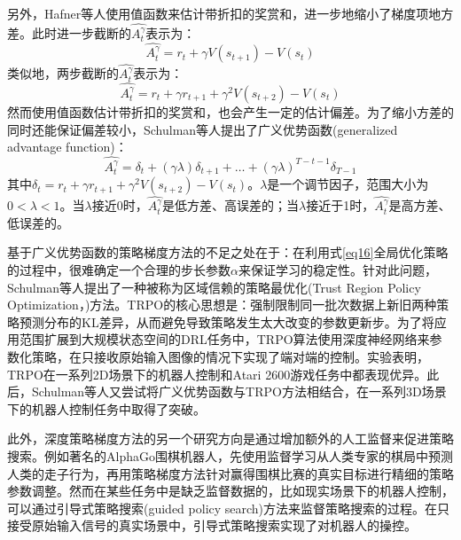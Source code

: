 \documentclass[bachelor]{thesis-uestc}
\begin{document}
	另外，Hafner等人使用值函数来估计带折扣的奖赏和，进一步地缩小了梯度项地方差。此时进一步截断的$\hat{A_t^\gamma}$表示为：
	\begin{equation}
		\label{eq20}
		\hat{A_t^\gamma}=r_t+\gamma V(s_{t+1})-V(s_t)
	\end{equation}
	类似地，两步截断的$\hat{A_t^\gamma}$表示为：
	\begin{equation}
		\label{eq21}
		\hat{A_t^\gamma}=r_t+\gamma r_{t+1}+\gamma^2V(s_{t+2})-V(s_t)
	\end{equation}
	然而使用值函数估计带折扣的奖赏和，也会产生一定的估计偏差。为了缩小方差的同时还能保证偏差较小，Schulman等人提出了广义优势函数(generalized advantage function)：
	\begin{equation}
		\label{eq22}
		\hat{A_t^\gamma}=\delta_t+(\gamma\lambda)\delta_{t+1}+\dots+(\gamma\lambda)^{T-t-1}\delta_{T-1}
	\end{equation}
	其中$\delta_t=r_t+\gamma r_{t+1}+\gamma^2V(s_{t+2})-V(s_t)$。$\lambda$是一个调节因子，范围大小为$0<\lambda<1$。当$\lambda$接近0时，$\hat{A_t^\gamma}$是低方差、高误差的；当$\lambda$接近于1时，$\hat{A_t^\gamma}$是高方差、低误差的。
	
	基于广义优势函数的策略梯度方法的不足之处在于：在利用式\ref{eq16}全局优化策略的过程中，很难确定一个合理的步长参数$\alpha$来保证学习的稳定性。针对此问题，Schulman等人提出了一种被称为区域信赖的策略最优化(Trust Region Policy Optimization，)方法。TRPO的核心思想是：强制限制同一批次数据上新旧两种策略预测分布的KL差异，从而避免导致策略发生太大改变的参数更新步。为了将应用范围扩展到大规模状态空间的DRL任务中，TRPO算法使用深度神经网络来参数化策略，在只接收原始输入图像的情况下实现了端对端的控制。实验表明，TRPO在一系列2D场景下的机器人控制和Atari 2600游戏任务中都表现优异。此后，Schulman等人又尝试将广义优势函数与TRPO方法相结合，在一系列3D场景下的机器人控制任务中取得了突破。
	
	此外，深度策略梯度方法的另一个研究方向是通过增加额外的人工监督来促进策略搜索。例如著名的AlphaGo围棋机器人，先使用监督学习从人类专家的棋局中预测人类的走子行为，再用策略梯度方法针对赢得围棋比赛的真实目标进行精细的策略参数调整。然而在某些任务中是缺乏监督数据的，比如现实场景下的机器人控制，可以通过引导式策略搜索(guided policy search)方法来监督策略搜索的过程。在只接受原始输入信号的真实场景中，引导式策略搜索实现了对机器人的操控。
	
\end{document}
